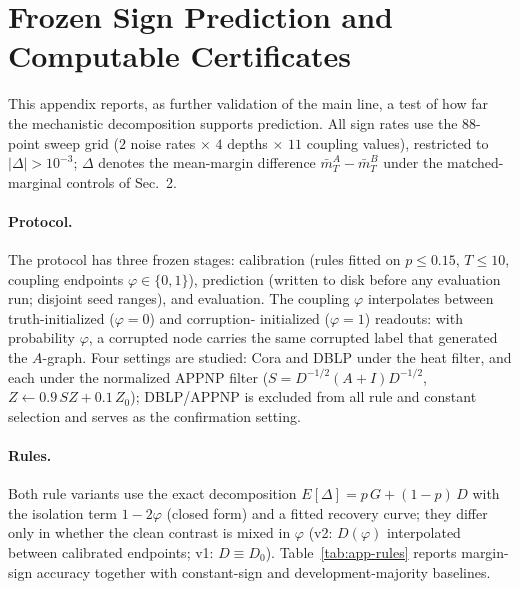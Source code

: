 
\section{Frozen Sign Prediction and Computable Certificates}
\label{app:signpred}

This appendix reports, as further validation of the main line, a
test of how far the mechanistic decomposition supports prediction.
All sign rates use the 88-point sweep grid ($2$ noise rates
$\times$ $4$ depths $\times$ $11$ coupling values), restricted to
$|\Delta|>10^{-3}$; $\Delta$ denotes the mean-margin difference
$\bar m^{A}_T-\bar m^{B}_T$ under the matched-marginal controls
of Sec.~2.

\paragraph{Protocol.}
The protocol has three frozen stages: calibration (rules fitted on
$p\le0.15$, $T\le10$, coupling endpoints $\varphi\in\{0,1\}$),
prediction (written to disk before any evaluation run; disjoint
seed ranges), and evaluation. The coupling $\varphi$ interpolates
between truth-initialized ($\varphi{=}0$) and corruption-
initialized ($\varphi{=}1$) readouts: with probability $\varphi$,
a corrupted node carries the same corrupted label that generated
the $A$-graph. Four settings are studied: Cora and DBLP under the
heat filter, and each under the normalized APPNP filter
($S=D^{-1/2}(A{+}I)D^{-1/2}$, $Z\leftarrow0.9\,SZ+0.1\,Z_0$);
DBLP/APPNP is excluded from all rule and constant selection and
serves as the confirmation setting.

\paragraph{Rules.}
Both rule variants use the exact decomposition
$E[\Delta]=p\,G+(1-p)\,D$ with the isolation term $1-2\varphi$
(closed form) and a fitted recovery curve; they differ only in
whether the clean contrast is mixed in $\varphi$ (v2: $D(\varphi)$
interpolated between calibrated endpoints; v1: $D\equiv D_{0}$).
Table~\ref{tab:app-rules} reports margin-sign accuracy together
with constant-sign and development-majority baselines.

